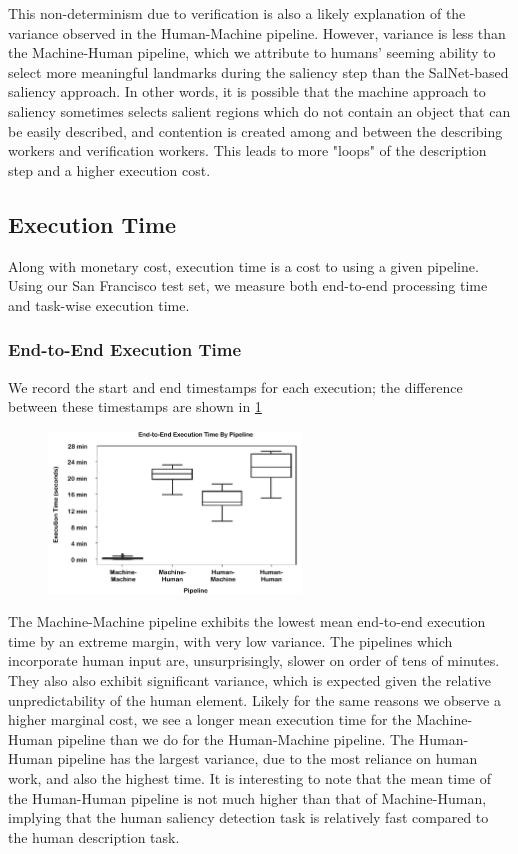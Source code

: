 This non-determinism due to verification is also a likely explanation of the variance observed in the Human-Machine pipeline. However, variance is less than the Machine-Human pipeline, which we attribute to humans' seeming ability to select more meaningful landmarks during the saliency step than the SalNet-based saliency approach. In other words, it is possible that the machine approach to saliency sometimes selects salient regions which do not contain an object that can be easily described, and contention is created among and between the describing workers and verification workers. This leads to more "loops" of the description step and a higher execution cost.

\subsection{Execution Time}
Along with monetary cost, execution time is a cost to using a given pipeline. Using our San Francisco test set, we measure both end-to-end processing time and task-wise execution time.

\subsubsection{End-to-End Execution Time}
We record the start and end timestamps for each execution; the difference between these timestamps are shown in \ref{fig:plot:executiontime}

\begin{figure}[htbp]
  \centering
  \includegraphics[width=0.6\textwidth]{images/plot_executiontime.pdf}
  \caption{}
  \label{fig:plot:executiontime}
\end{figure}

The Machine-Machine pipeline exhibits the lowest mean end-to-end execution time by an extreme margin, with very low variance. The pipelines which incorporate human input are, unsurprisingly, slower on order of tens of minutes. They also also exhibit significant variance, which is expected given the relative unpredictability of the human element. Likely for the same reasons we observe a higher marginal cost, we see a longer mean execution time for the Machine-Human pipeline than we do for the Human-Machine pipeline. The Human-Human pipeline has the largest variance, due to the most reliance on human work, and also the highest time. It is interesting to note that the mean time of the Human-Human pipeline is not much higher than that of Machine-Human, implying that the human saliency detection task is relatively fast compared to the human description task.

